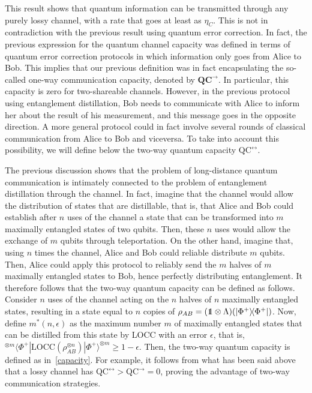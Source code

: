 \documentclass[a4paper]{article}
\def\one{\leavevmode\hbox{\small1\normalsize\kern-.33em1}}
\def\bra#1{\langle#1|} \def\ket#1{|#1\rangle}
\def\proj#1{\ket{#1}\!\bra{#1}}
\begin{document}
 This result shows that quantum information can be transmitted through any purely lossy channel, with a rate that goes at least as $\eta_C$. This is not in contradiction with the previous result using quantum error correction. In fact, the previous expression for the quantum channel capacity was defined in terms of quantum error correction protocols in which information only goes from Alice to Bob. This implies that our previous definition was in fact encapsulating the so-called one-way communication capacity, denoted by $\textbf{QC}^\rightarrow$. In particular, this capacity is zero for two-shareable channels. However, in the previous protocol using entanglement distillation, Bob needs to communicate with Alice to inform her about the result of his measurement, and this message goes in the opposite direction. A more general protocol could in fact involve several rounds of classical communication from Alice to Bob and viceversa. To take into account this possibility, we will define below the two-way quantum capacity $\text{QC}^\leftrightarrow$. 
 
The previous discussion shows that the problem of long-distance quantum communication is intimately connected to the problem of entanglement distillation through the channel. In fact, imagine that the channel would allow the distribution of states that are distillable, that is, that Alice and Bob could establish after $n$ uses of the channel a state that can be transformed into $m$ maximally entangled states of two qubits. Then, these $n$ uses would allow the exchange of $m$ qubits through teleportation. On the other hand, imagine that,  using $n$ times the channel, Alice and Bob could reliable distribute $m$ qubits. Then, Alice could apply this protocol to reliably send the $m$ halves of $m$ maximally entangled states to Bob, hence perfectly distributing entanglement.
It therefore follows that the two-way quantum capacity can be defined as follows. Consider $n$ uses of the channel acting on the $n$ halves of $n$ maximally entangled states, resulting in a state equal to $n$ copies of $\rho_{AB}=(\one\otimes\Lambda)(\proj{\Phi^+})$. Now, define $m^*(n,\epsilon)$ as the maximum number $m$ of maximally entangled states that can be distilled from this state by LOCC with an error $\epsilon$, that is, $^{\otimes m}\bra{\Phi^+}\text{LOCC}(\rho_{AB}^{\otimes n})\ket{\Phi^+}^{\otimes m}\geq 1-\epsilon$. Then, the two-way quantum capacity is defined as in~\eqref{capacity}. For example, it follows from what has been said above that a lossy channel has $\text{QC}^\leftrightarrow>\text{QC}^\rightarrow=0$, proving the advantage of two-way communication strategies.
\end{document}
